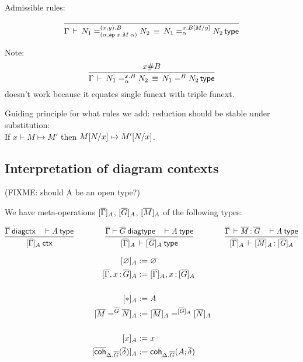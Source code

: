 Admissible rules:

\[
\infer{\deqtp{\Gamma}{\iidover{(x,y).B}{(\alpha,\ap{x.M}{\alpha})}{N_1}{N_2}}
                     {\iidover{x.\subst{B}{M}{y}}{\alpha}{N_1}{N_2}}}
      {}
\]


Note:
\[
\infer{\deqtp{\Gamma}{\iidover{x.B}{\alpha}{N_1}{N_2}}
                     {\iid{B}{N_1}{N_2}}}
      {x \# B}
\]
doesn't work because it equates single funext with triple funext.  

Guiding principle for what rules we add:
reduction should be stable under substitution: \\
If $x \vdash M \mapsto M'$ then $M [ N / x] \mapsto
M' [ N / x]$.  

\subsection{Interpretation of diagram contexts}

(FIXME: should A be an open type?)

We have meta-operations $[ \overline{\Gamma} ]_{A}$, $[ \overline{G} ]_{A}$, $[ \overline{M} ]_{A}$ of the following types:
\begin{small}
\[
\infer{\wfctx{\interpdiag{\diag\Gamma}{A}}}
      {\wfdiagctx{\diag\Gamma} & \wftp{}{A}}
\qquad\qquad
\infer{\wftp{\interpdiag{\diag\Gamma}{A}}{\interpdiag{\diag G}{A}}}
      {\wfdiagtp{\diag\Gamma}{\diag G} & \wftp{}{A}}
\qquad\qquad
\infer{\oftp{\interpdiag{\diag\Gamma}{A}}{\interpdiag{\diag M}{A}}{\interpdiag{\diag G}{A}}}
      {\oftp{\diag\Gamma}{\diag M}{\diag G} & \wftp{}{A}}
\]
\end{small}


\begin{small}
\[\begin{aligned}
\interpdiag{\emptyctx}{A} &:= \emptyctx \\
\interpdiag{\diag\Gamma,\tptm{x}{\diag G}}{A} &:=
\interpdiag{\diag\Gamma}{A},\tptm{x}{\interpdiaglob{\diag G}{A}} \\
&\\
\interpdiag{\diagbase}{A} &:= A \\
\interpdiag{\iid{\diag G}{\diag M}{\diag N}}{A} &:= \iid{\interpdiag{\diag
G}{A}}{\interpdiag{\diag M}A}{\interpdiag{\diag N}A} \\
&\\
\interpdiag{x}{A} &:= x \\
\interpdiag{\diagcoh{\Delta.\diag G}{\diag\delta}}{A} &:= 
\coh{\Delta.\diag G}{A}{\diag\delta}
\end{aligned}\]
\end{small}

